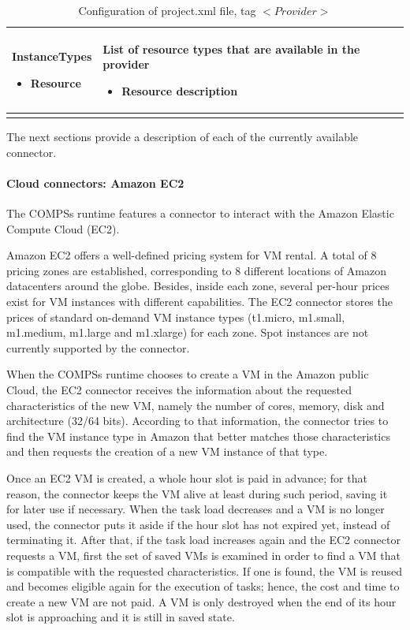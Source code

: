 \begin{longtable}{| p{} | p{} |}
  InstanceTypes
  \begin{itemize}
  \item Resource
  \end{itemize}
  & 
  List of resource types that are available in the provider
  \begin{itemize}
  \item Resource description
  \end{itemize}
  \\
  \hline
  
  \caption{Configuration of project.xml file, tag $<Provider>$}
  \label{tab:conf_project_xml_provider}
\end{longtable}

The next sections provide a description of each of the currently available connector.

\newpage

\paragraph{Cloud connectors: Amazon EC2}
The COMPSs runtime features a connector to interact with the Amazon Elastic Compute Cloud (EC2).

Amazon EC2 offers a well-defined pricing system for VM rental. A total of 8 pricing zones are 
established, corresponding to 8 different locations of Amazon datacenters around the globe. 
Besides, inside each zone, several per-hour prices exist for VM instances with different capabilities. 
The EC2 connector stores the prices of standard on-demand VM instance types (t1.micro, m1.small, 
m1.medium, m1.large and m1.xlarge) for each zone. Spot instances are not currently supported by the connector.

When the COMPSs runtime chooses to create a VM in the Amazon public Cloud, the EC2 connector receives 
the information about the requested characteristics of the new VM, namely the number of cores, memory, 
disk and architecture (32/64 bits). According to that information, the connector tries to find the VM 
instance type in Amazon that better matches those characteristics and then requests the creation of a 
new VM instance of that type.

Once an EC2 VM is created, a whole hour slot is paid in advance; for that reason, the connector keeps 
the VM alive at least during such period, saving it for later use if necessary. When the task load 
decreases and a VM is no longer used, the connector puts it aside if the hour slot has not expired yet, 
instead of terminating it. After that, if the task load increases again and the EC2 connector requests 
a VM, first the set of saved VMs is examined in order to find a VM that is compatible with the requested 
characteristics. If one is found, the VM is reused and becomes eligible again for the execution of tasks; 
hence, the cost and time to create a new VM are not paid. A VM is only destroyed when the end of its hour 
slot is approaching and it is still in saved state.

